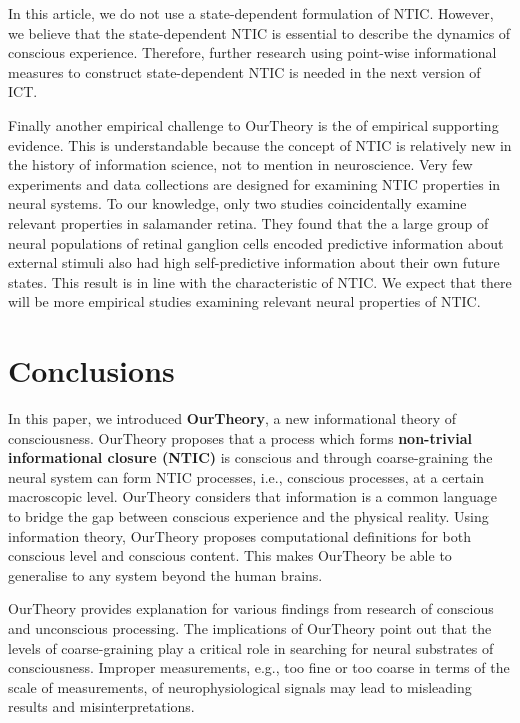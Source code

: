 \documentclass[utf8]{article}
\begin{document}
        In this article, we do not use a state-dependent formulation of NTIC. However, we believe that the state-dependent NTIC is essential to describe the dynamics of conscious experience. Therefore, further research using point-wise informational measures to construct state-dependent NTIC is needed in the next version of ICT.
        
        Finally another empirical challenge to \ac{OurTheory} is the  of empirical supporting evidence. This is understandable because the concept of NTIC is relatively new in the history of information science, not to mention in neuroscience. Very few experiments and data collections are designed for examining NTIC properties in neural systems. To our knowledge, only two studies \citep{Palmer2015, sederberg2018learning} coincidentally examine relevant properties in salamander retina. They found that the a large group of neural populations of retinal ganglion cells encoded predictive information about external stimuli also had high self-predictive information about their own future states. This result is in line with the characteristic of NTIC. We expect that there will be more empirical studies examining relevant neural properties of NTIC. 

    \section{Conclusions}
    In this paper, we introduced \textbf{\acf{OurTheory}}, a new informational theory of consciousness. \ac{OurTheory} proposes that a process which forms \textbf{non-trivial informational closure (NTIC)} is conscious and through coarse-graining the neural system can form NTIC processes, i.e., conscious processes, at a certain macroscopic level. \ac{OurTheory} considers that information is a common language to bridge the gap between conscious experience and the physical reality. Using information theory, \ac{OurTheory} proposes computational definitions for both conscious level and conscious content. This makes \ac{OurTheory} be able to generalise to any system beyond the human brains. 
    
    \ac{OurTheory} provides explanation for various findings from research of conscious and unconscious processing. The implications of \ac{OurTheory} point out that the levels of coarse-graining play a critical role in searching for neural substrates of consciousness. Improper measurements, e.g., too fine or too coarse in terms of the scale of measurements, of neurophysiological signals may lead to misleading results and misinterpretations. 
    
\end{document}
